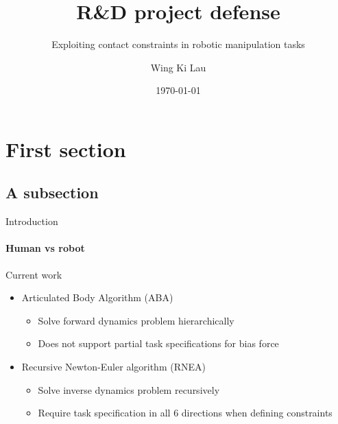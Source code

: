 \documentclass[aspectratio=169]{beamer}
\author[Lau]{Wing Ki Lau}
\title{R\&D project defense}
\subtitle{Exploiting contact constraints in robotic manipulation tasks}
\institute[HBRS]{Hochschule Bonn-Rhein-Sieg}
\date{\today}
\begin{document}
{
\begin{frame}
\titlepage
\end{frame}
}


\section{First section}
\subsection{A subsection}

\begin{frame}{Introduction}
    \framesubtitle{Human vs robot}
    \begin{figure}
      \hspace{0.5em}
    \end{figure}
\end{frame}


\begin{frame}{Current work}
  \begin{itemize}
    \item Articulated Body Algorithm (ABA)
    \begin{itemize}
      \item Solve forward dynamics problem hierarchically \cite{featherstone1983calculation}
      \item Does not support partial task specifications for bias force 
    \end{itemize}
    \item Recursive Newton-Euler algorithm (RNEA)
    \begin{itemize}
      \item Solve inverse dynamics problem recursively \cite{featherstone2007book} \cite{featherstone1999divide}
      \item Require task specification in all 6 directions when defining constraints
    \end{itemize}
\end{itemize}
\end{frame}
\end{document}
